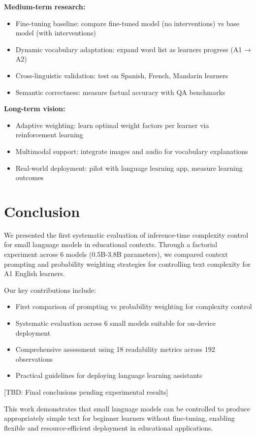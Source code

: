 \documentclass[10pt, a4paper]{article}
\begin{document}
\textbf{Medium-term research:}
\begin{itemize}
\item Fine-tuning baseline: compare fine-tuned model (no interventions) vs base model (with interventions)
\item Dynamic vocabulary adaptation: expand word list as learners progress (A1 → A2)
\item Cross-linguistic validation: test on Spanish, French, Mandarin learners
\item Semantic correctness: measure factual accuracy with QA benchmarks
\end{itemize}

\textbf{Long-term vision:}
\begin{itemize}
\item Adaptive weighting: learn optimal weight factors per learner via reinforcement learning
\item Multimodal support: integrate images and audio for vocabulary explanations
\item Real-world deployment: pilot with language learning app, measure learning outcomes
\end{itemize}

\section{Conclusion}

We presented the first systematic evaluation of inference-time complexity control for small language models in educational contexts. Through a factorial experiment across 6 models (0.5B-3.8B parameters), we compared context prompting and probability weighting strategies for controlling text complexity for A1 English learners.

Our key contributions include:
\begin{itemize}
\item First comparison of prompting vs probability weighting for complexity control
\item Systematic evaluation across 6 small models suitable for on-device deployment
\item Comprehensive assessment using 18 readability metrics across 192 observations
\item Practical guidelines for deploying language learning assistants
\end{itemize}

[TBD: Final conclusions pending experimental results]

This work demonstrates that small language models can be controlled to produce appropriately simple text for beginner learners without fine-tuning, enabling flexible and resource-efficient deployment in educational applications.
\end{document}
